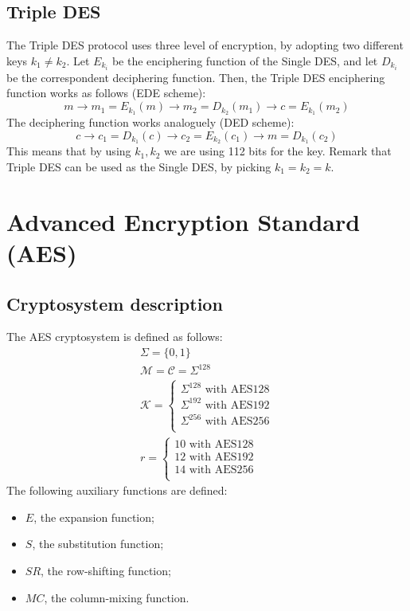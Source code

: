 \subsection{Triple DES}
The Triple DES protocol uses three level of encryption, by adopting two different keys $k_{1} \neq k_{2}$.\newline
Let $E_{k_{i}}$ be the enciphering function of the Single DES, and let $D_{k_{i}}$ be the correspondent deciphering function. Then, the Triple DES enciphering function works as follows (EDE scheme):
\[m \rightarrow m_{1} = E_{k_{1}}(m) \rightarrow m_{2} = D_{k_{2}}(m_{1}) \rightarrow c = E_{k_{1}}(m_{2})\]
The deciphering function works analoguely (DED scheme):
\[c \rightarrow c_{1} = D_{k_{1}}(c) \rightarrow c_{2} = E_{k_{2}}(c_{1}) \rightarrow m = D_{k_{1}}(c_{2})\]
This means that by using $k_{1}, k_{2}$ we are using 112 bits for the key. \newline
Remark that Triple DES can be used as the Single DES, by picking $k_{1} = k_{2} = k$.

\section{Advanced Encryption Standard (AES)}
\subsection{Cryptosystem description}
The AES cryptosystem is defined as follows:
\begin{align*}
    \Sigma = \{0,1\} \\
    \mathcal{M} = \mathcal{C} = \Sigma^{128}\\
    \mathcal{K} =
    \begin{cases}
        \Sigma^{128} \text{ with AES128}\\
        \Sigma^{192} \text{ with AES192}\\
        \Sigma^{256} \text{ with AES256}\\
    \end{cases}\\
    r =
    \begin{cases}
        10 \text{ with AES128}\\
        12 \text{ with AES192}\\
        14 \text{ with AES256}\\
    \end{cases}
\end{align*}
The following auxiliary functions are defined:
\begin{itemize}
    \item $E$, the expansion function;
    \item $S$, the substitution function;
    \item $SR$, the row-shifting function;
    \item $MC$, the column-mixing function.
\end{itemize}

